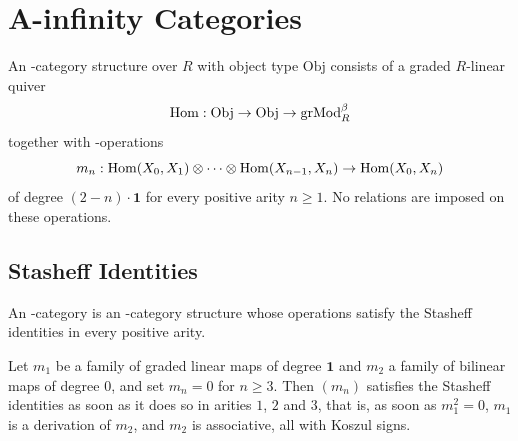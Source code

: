 
\chapter{A-infinity Categories}

\begin{definition}
\label{AInfinityTheory.AInfinityCategoryStruct}
\leanok
{}
An \Ainf{}-category structure over $R$ with object type $\mathrm{Obj}$ consists of a
graded $R$-linear quiver
\[
  \operatorname{Hom} : \mathrm{Obj} \to \mathrm{Obj} \to \operatorname{grMod}_R^\beta
\]
together with \Ainf{}-operations
\[
  m_n : \operatorname{Hom}(X_0, X_1) \otimes \dots \otimes \operatorname{Hom}(X_{n-1}, X_n) \to \operatorname{Hom}(X_0, X_n)
\]
of degree $(2-n) \cdot \mathbf{1}$ for every positive arity $n \geq 1$. No relations are
imposed on these operations.
\end{definition}

\section{Stasheff Identities}

\begin{definition}
\label{AInfinityTheory.AInfinityCategory}
\leanok
{}
An \Ainf{}-category is an \Ainf{}-category structure whose operations satisfy the
Stasheff identities in every positive arity.
\end{definition}

\begin{proposition}
\label{AInfinityTheory.AInfinityCategory.ofArityLeTwo}
\leanok
{}
Let $m_1$ be a family of graded linear maps of degree $\mathbf{1}$ and $m_2$ a family of
bilinear maps of degree $0$, and set $m_n = 0$ for $n \geq 3$. Then $(m_n)$ satisfies the Stasheff identities
as soon as it does so in arities $1$, $2$ and $3$, that is, as soon as $m_1^2 = 0$, $m_1$ is a
derivation of $m_2$, and $m_2$ is associative, all with Koszul signs.
\end{proposition}

